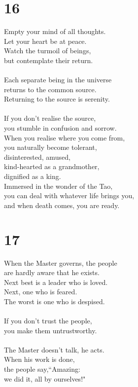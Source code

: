 \documentclass[b5paper, 12pt, oneside]{book}
\begin{document}
\chapter*{16}
Empty your mind of all thoughts.\\
Let your heart be at peace.\\
Watch the turmoil of beings,\\
but contemplate their return.\\
\\
Each separate being in the universe\\
returns to the common source.\\
Returning to the source is serenity.\\
\\
If you don't realise the source,\\
you stumble in confusion and sorrow.\\
When you realise where you come from,\\
you naturally become tolerant,\\
disinterested, amused,\\
kind-hearted as a grandmother,\\
dignified as a king.\\
Immersed in the wonder of the Tao,\\
you can deal with whatever life brings you,\\
and when death comes, you are ready.

\chapter*{17}
When the Master governs, the people\\
are hardly aware that he exists.\\
Next best is a leader who is loved.\\
Next, one who is feared.\\
The worst is one who is despised.\\
\\
If you don't trust the people,\\
you make them untrustworthy.\\
\\
The Master doesn't talk, he acts.\\
When his work is done,\\
the people say,``Amazing:\\
we did it, all by ourselves!"\\
\end{document}
